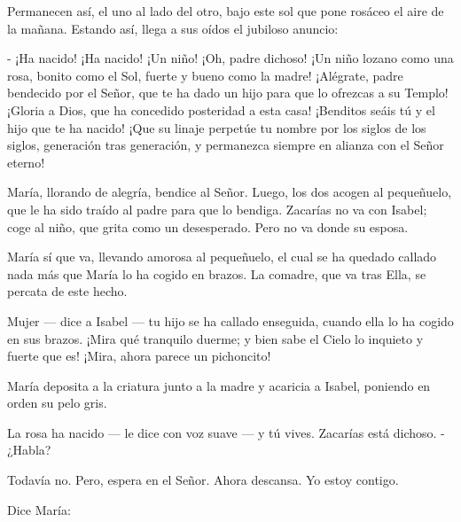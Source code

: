 \documentclass[12pt, twoside, openright]{book} %
\begin{document}
Permanecen así, el uno al lado del otro, bajo este sol que pone rosáceo el aire de la mañana. Estando así, llega a sus oídos el jubiloso anuncio: 

- ¡Ha nacido! ¡Ha nacido! ¡Un niño! ¡Oh, padre dichoso! ¡Un niño lozano como una rosa, bonito como el Sol, fuerte y bueno como la madre! ¡Alégrate, padre bendecido por el Señor, que te ha dado un hijo para que lo ofrezcas a su Templo! ¡Gloria a Dios, que ha concedido posteridad a esta casa! ¡Benditos seáis tú y el hijo que te ha nacido! ¡Que su linaje perpetúe tu nombre por los siglos de los siglos, generación tras generación, y permanezca siempre en alianza con el Señor eterno! 

María, llorando de alegría, bendice al Señor. Luego, los dos acogen al pequeñuelo, que le ha sido traído al padre para que lo bendiga. Zacarías no va con Isabel; coge al niño, que grita como un desesperado. Pero no va donde su esposa. 

María sí que va, llevando amorosa al pequeñuelo, el cual se ha quedado callado nada más que María lo ha cogido en brazos. La comadre, que va tras Ella, se percata de este hecho. 

Mujer — dice a Isabel — tu hijo se ha callado enseguida, cuando ella lo ha cogido en sus brazos. ¡Mira qué tranquilo duerme; y bien sabe el Cielo lo inquieto y fuerte que es! ¡Mira, ahora parece un pichoncito! 

María deposita a la criatura junto a la madre y acaricia a Isabel, poniendo en orden su pelo gris. 

La rosa ha nacido — le dice con voz suave — y tú vives. Zacarías está dichoso. - ¿Habla? 

Todavía no. Pero, espera en el Señor. Ahora descansa. Yo estoy contigo. 

Dice María: 
\end{document}
